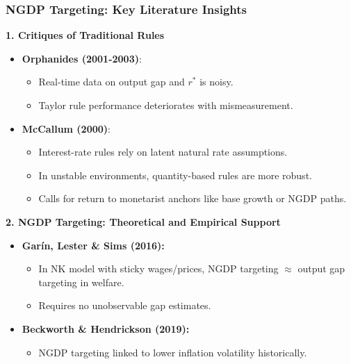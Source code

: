 \documentclass{beamer}
\begin{document}
\begin{frame}
\frametitle{NGDP Targeting: Key Literature Insights}

\textbf{1. Critiques of Traditional Rules}

\begin{itemize}
  \item \textbf{Orphanides (2001-2003)}:
  \begin{itemize}
    \item Real-time data on output gap and $r^*$ is noisy.
    \item Taylor rule performance deteriorates with mismeasurement.
  \end{itemize}

  \item \textbf{McCallum (2000)}:
  \begin{itemize}
    \item Interest-rate rules rely on latent natural rate assumptions.
    \item In unstable environments, quantity-based rules are more robust.
    \item Calls for return to monetarist anchors like base growth or NGDP paths.
  \end{itemize}
\end{itemize}

\vspace{0.3cm}
\textbf{2. NGDP Targeting: Theoretical and Empirical Support}

\begin{itemize}
  \item \textbf{Garín, Lester \& Sims (2016):}
  \begin{itemize}
    \item In NK model with sticky wages/prices, NGDP targeting $\approx$ output gap targeting in welfare.
    \item Requires no unobservable gap estimates.
  \end{itemize}

  \item \textbf{Beckworth \& Hendrickson (2019):}
  \begin{itemize}
    \item NGDP targeting linked to lower inflation volatility historically.
  \end{itemize}
\end{itemize}

\end{frame}
\end{document}
